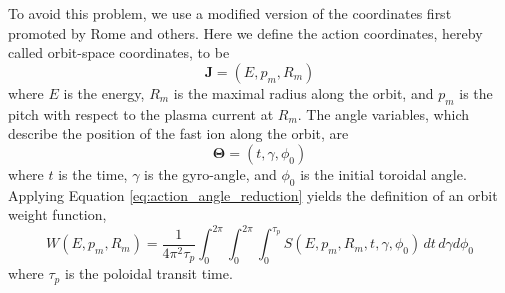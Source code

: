 To avoid this problem, we use a modified version of the coordinates first promoted by Rome\cite{rome1979} and others\cite{petrov2016}.
Here we define the action coordinates, hereby called orbit-space coordinates, to be
\begin{equation}\label{eq:orbit_action}
    \mathbf{J} = (E, p_m, R_m)
\end{equation}
where $E$ is the energy, $R_m$ is the maximal radius along the orbit, and $p_m$ is the pitch with respect to the plasma current at $R_m$.
The angle variables, which describe the position of the fast ion along the orbit, are
\begin{equation}\label{eq:orbit_angle}
    \mathbf{\Theta} = (t, \gamma, \phi_0)
\end{equation}
where $t$ is the time, $\gamma$ is the gyro-angle, and $\phi_0$ is the initial toroidal angle.
Applying Equation \ref{eq:action_angle_reduction} yields the definition of an orbit weight function,
\begin{equation}\label{eq:orbit_weight}
    W(E,p_m,R_{m}) = \frac{1}{4\pi^2 \tau_p}\int_0^{2\pi} \int_0^{2\pi} \int_0^{\tau_p} S(E,p_m,R_{m},t,\gamma,\phi_0)\,dt\, d\gamma d\phi_0
\end{equation}
where $\tau_p$ is the poloidal transit time.

